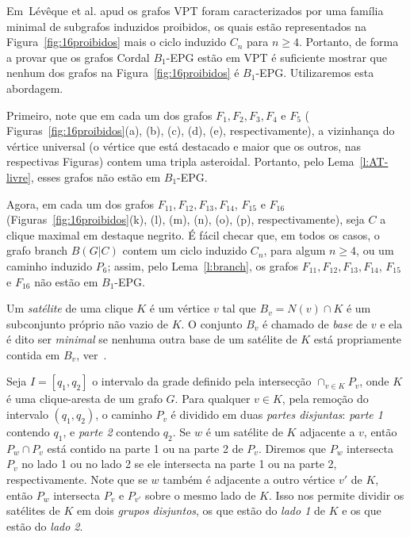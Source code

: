 Em~L{\'e}v{\^e}que et al. \cite{leveque2009characterizing} apud \cite{alcon2015characterizing} os grafos VPT foram caracterizados por uma família minimal de subgrafos induzidos proibidos,
os quais estão representados na
Figura~\ref{fig:16proibidos} mais o ciclo induzido  $C_n$ para $n\geq 4$. Portanto, de forma a provar que os grafos Cordal $B_1$-EPG estão em VPT é suficiente mostrar que nenhum dos grafos na Figura~\ref{fig:16proibidos} 
é $B_1$-EPG. Utilizaremos esta abordagem. %

Primeiro, note que em cada um dos grafos $F_{1}, F_{2}, F_{3}, F_{4}$ e $F_{5}$ ( Figuras~\ref{fig:16proibidos}(a), (b), (c), (d), (e), respectivamente), a vizinhança do  vértice universal (o vértice que está destacado e maior que os outros, nas respectivas Figuras) contem uma  tripla asteroidal. Portanto, pelo Lema~\ref{l:AT-livre}, esses grafos não estão em  $B_1$-EPG.

Agora, em cada um dos grafos $F_{11}, F_{12}, F_{13}, F_{14}$, $F_{15}$ e $F_{16}$  (Figuras~\ref{fig:16proibidos}(k), (l), (m), (n), (o), (p), respectivamente), seja $C$ a clique maximal em destaque negrito. É fácil checar que, em todos os casos, o grafo branch $B(G|C)$ contem um ciclo induzido $C_n$, para algum  $n\geq 4$, ou um caminho induzido $P_6$; assim, pelo  Lema~\ref{l:branch}, os grafos $F_{11}, F_{12}, F_{13}, F_{14}$, $F_{15}$ e $F_{16}$ não estão em $B_1$-EPG.



Um \textit{satélite} de uma clique $K$ é um vértice $v$ tal que $B_v=N(v)\cap K$ é um
subconjunto próprio não vazio de  $K$. O conjunto $B_v$ é chamado de \textit{base} de $v$ e  ela é dito ser \textit{minimal} se nenhuma outra base de um satélite de $K$ está propriamente contida em $B_v$, ver~\cite{alcon2010necessary}.

 Seja $I=[q_1,q_2]$ o intervalo da grade definido pela intersecção $\displaystyle \cap_{v\in K}P_v$, onde $K$
é uma clique-aresta de um grafo $G$. Para qualquer $v\in K$, pela remoção do intervalo $(q_1,q_2)$, o caminho $P_v$
é dividido em duas \textit{partes disjuntas}: \textit{parte 1}  contendo  $q_1$, e  \textit{parte 2}  contendo $q_2$.
Se $w$  é um satélite de $K$ adjacente a $v$, então $P_w\cap P_v$ está contido na parte 1 ou na parte 2 de $P_v$. Diremos que  $P_w$ intersecta $P_v$ no lado 1 ou no lado 2 se ele intersecta na parte 1 ou na parte 2, respectivamente.  Note  que se $w$  também é adjacente a outro vértice $v'$ de $K$, então  $P_w$ intersecta $P_v$ e $P_{v'}$ sobre o mesmo lado de $K$. Isso nos permite dividir os satélites de $K$ em dois \textit{grupos disjuntos}, os que estão do  \textit{lado 1} de $K$ e os que estão do \textit{lado 2}.

